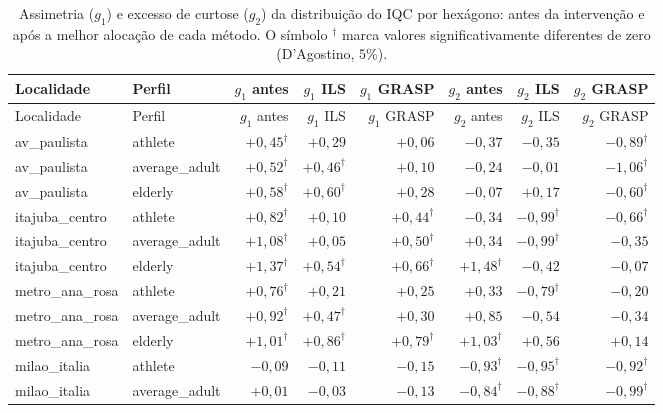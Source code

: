 \documentclass[11pt,a4paper]{article}
\begin{document}
\renewcommand{\arraystretch}{1.12}
\begin{longtable}{@{}l l r r r r r r@{}}
\caption{Assimetria ($g_1$) e excesso de curtose ($g_2$) da distribuição do IQC por hexágono: antes da intervenção e após a melhor alocação de cada método. O símbolo $^{\dagger}$ marca valores significativamente diferentes de zero (D'Agostino, $5\%$).}\label{tab:comp-shape}\\
\toprule
Localidade & Perfil & $g_1$ antes & $g_1$ ILS & $g_1$ GRASP & $g_2$ antes & $g_2$ ILS & $g_2$ GRASP \\
\midrule
\endfirsthead
\toprule
Localidade & Perfil & $g_1$ antes & $g_1$ ILS & $g_1$ GRASP & $g_2$ antes & $g_2$ ILS & $g_2$ GRASP \\
\midrule
\endhead
av\_paulista & athlete & $+0{,}45^{\dagger}$ & $+0{,}29$ & $+0{,}06$ & $-0{,}37$ & $-0{,}35$ & $-0{,}89^{\dagger}$ \\
av\_paulista & average\_adult & $+0{,}52^{\dagger}$ & $+0{,}46^{\dagger}$ & $+0{,}10$ & $-0{,}24$ & $-0{,}01$ & $-1{,}06^{\dagger}$ \\
av\_paulista & elderly & $+0{,}58^{\dagger}$ & $+0{,}60^{\dagger}$ & $+0{,}28$ & $-0{,}07$ & $+0{,}17$ & $-0{,}60^{\dagger}$ \\
itajuba\_centro & athlete & $+0{,}82^{\dagger}$ & $+0{,}10$ & $+0{,}44^{\dagger}$ & $-0{,}34$ & $-0{,}99^{\dagger}$ & $-0{,}66^{\dagger}$ \\
itajuba\_centro & average\_adult & $+1{,}08^{\dagger}$ & $+0{,}05$ & $+0{,}50^{\dagger}$ & $+0{,}34$ & $-0{,}99^{\dagger}$ & $-0{,}35$ \\
itajuba\_centro & elderly & $+1{,}37^{\dagger}$ & $+0{,}54^{\dagger}$ & $+0{,}66^{\dagger}$ & $+1{,}48^{\dagger}$ & $-0{,}42$ & $-0{,}07$ \\
metro\_ana\_rosa & athlete & $+0{,}76^{\dagger}$ & $+0{,}21$ & $+0{,}25$ & $+0{,}33$ & $-0{,}79^{\dagger}$ & $-0{,}20$ \\
metro\_ana\_rosa & average\_adult & $+0{,}92^{\dagger}$ & $+0{,}47^{\dagger}$ & $+0{,}30$ & $+0{,}85$ & $-0{,}54$ & $-0{,}34$ \\
metro\_ana\_rosa & elderly & $+1{,}01^{\dagger}$ & $+0{,}86^{\dagger}$ & $+0{,}79^{\dagger}$ & $+1{,}03^{\dagger}$ & $+0{,}56$ & $+0{,}14$ \\
milao\_italia & athlete & $-0{,}09$ & $-0{,}11$ & $-0{,}15$ & $-0{,}93^{\dagger}$ & $-0{,}95^{\dagger}$ & $-0{,}92^{\dagger}$ \\
milao\_italia & average\_adult & $+0{,}01$ & $-0{,}03$ & $-0{,}13$ & $-0{,}84^{\dagger}$ & $-0{,}88^{\dagger}$ & $-0{,}99^{\dagger}$ \\

\end{longtable}
\end{document}
